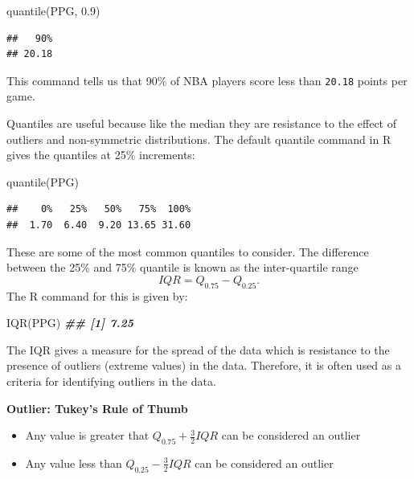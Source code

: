 \documentclass[
]{book}
\newenvironment{Shaded}{\begin{snugshade}}{\end{snugshade}}
\newcommand{\DocumentationTok}[1]{\textcolor[rgb]{0.56,0.35,0.01}{\textbf{\textit{#1}}}}
\newcommand{\FloatTok}[1]{\textcolor[rgb]{0.00,0.00,0.81}{#1}}
\newcommand{\FunctionTok}[1]{\textcolor[rgb]{0.00,0.00,0.00}{#1}}
\newcommand{\NormalTok}[1]{#1}
\providecommand{\tightlist}{%
  \setlength{\itemsep}{0pt}\setlength{\parskip}{0pt}}
\theoremstyle{definition}
\theoremstyle{definition}
\theoremstyle{definition}
\theoremstyle{definition}
\theoremstyle{remark}
\begin{document}
\begin{Shaded}
\begin{Highlighting}[]
\FunctionTok{quantile}\NormalTok{(PPG, }\FloatTok{0.9}\NormalTok{)}
\end{Highlighting}
\end{Shaded}

\begin{verbatim}
##   90% 
## 20.18
\end{verbatim}

This command tells us that 90\% of NBA players score less than \texttt{20.18} points per game.

Quantiles are useful because like the median they are resistance to the effect of outliers and non-symmetric distributions. The default quantile command in R gives the quantiles at 25\% increments:

\begin{Shaded}
\begin{Highlighting}[]
\FunctionTok{quantile}\NormalTok{(PPG)}
\end{Highlighting}
\end{Shaded}

\begin{verbatim}
##    0%   25%   50%   75%  100% 
##  1.70  6.40  9.20 13.65 31.60
\end{verbatim}

These are some of the most common quantiles to consider. The difference between the 25\% and 75\% quantile is known as the inter-quartile range \[IQR=Q_{0.75}-Q_{0.25}.\]
The R command for this is given by:

\begin{Shaded}
\begin{Highlighting}[]
\FunctionTok{IQR}\NormalTok{(PPG)}
\DocumentationTok{\#\# [1] 7.25}
\end{Highlighting}
\end{Shaded}

The IQR gives a measure for the spread of the data which is resistance to the presence of outliers (extreme values) in the data. Therefore, it is often used as a criteria for identifying outliers in the data.

\textbf{Outlier: Tukey's Rule of Thumb}

\begin{itemize}
\tightlist
\item
  Any value is greater that \(Q_{0.75}+\frac{3}{2} IQR\) can be considered an outlier
\item
  Any value less than \(Q_{0.25}-\frac{3}{2} IQR\) can be considered an outlier
\end{itemize}
\end{document}

